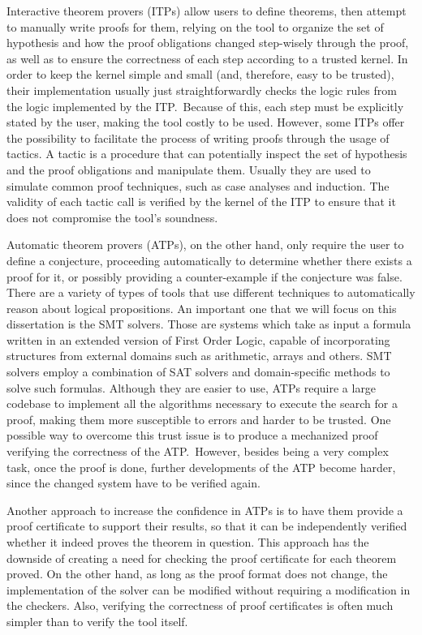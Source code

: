 Interactive theorem provers (ITPs) allow users to define
theorems, then attempt to manually write proofs for them,
relying on the tool to organize the set of hypothesis and
how the proof obligations changed step-wisely through the
proof, as well as to ensure the correctness of each step
according to a trusted kernel.
%
In order to keep the kernel simple and small (and, therefore,
easy to be trusted), their implementation usually just
straightforwardly checks the logic rules from the logic
implemented by the ITP.\ Because of this, each step must be
explicitly stated by the user, making the tool costly to be
used. However, some ITPs offer the possibility to facilitate
the process of writing proofs through the usage of tactics.
A tactic is a procedure that can potentially inspect the
set of hypothesis and the proof obligations and manipulate
them. Usually they are used to simulate common proof
techniques, such as case analyses and induction. The
validity of each tactic call is verified by the kernel
of the ITP to ensure that it does not compromise the tool's
soundness.
%

Automatic theorem provers (ATPs), on the other hand,
only require the user to define a conjecture, proceeding
automatically to determine whether there exists a proof
for it, or possibly providing a counter-example if
the conjecture was false.
%
There are a variety of types of tools that use different
techniques to automatically reason about logical propositions. An important one
that we will focus on this dissertation is the SMT solvers. Those are
systems which take as input a formula written in an extended version of First Order Logic,
capable of incorporating structures from external domains such as arithmetic,
arrays and others. SMT solvers employ a combination of SAT solvers and
domain-specific methods to solve such formulas.
%
Although they are easier to use, ATPs require a large
codebase to implement all the algorithms necessary to execute
the search for a proof, making them more susceptible to
errors and harder to be trusted. One possible way to overcome
this trust issue is to produce a mechanized proof verifying
the correctness of the ATP.\ However, besides being a very
complex task, once the proof is done, further developments of
the ATP become harder, since the changed system have to be
verified again.

Another approach to increase the confidence in ATPs is to have them provide a
proof certificate to support their results, so that it can be independently verified whether
it indeed proves the theorem in question. This approach has the downside of creating a need
for checking the proof certificate for each theorem proved.
On the other hand, as long as the proof format does not change, the implementation
of the solver can be modified without requiring a modification in the checkers. Also,
verifying the correctness of proof certificates is often much simpler than to verify
the tool itself.

